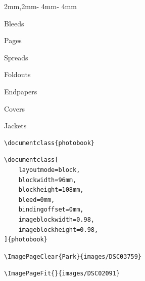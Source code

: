 \documentclass[
	layoutmode=block,
	blockwidth=96mm, blockheight=108mm,
	bleed=0mm,
	bindingoffset=0mm,
	imageblockwidth=0.98, imageblockheight=0.98,
	imageblockoffsettop=0mm,
	12pt,final,openany
]{photobook}
\newcommand\PageFushLeftC[1]{
	\begin{page}
		\begin{cell}{2mm,2mm}{\paperwidth - 4mm}{\paperheight - 4mm}
			\null
			\vfill
			\begin{flushleft}
				#1
			\end{flushleft}
			\vfill
			\null
		\end{cell}
	\end{page}}
\begin{document}
\PageFushLeftC{
		Bleeds

		Pages

		Spreads

		Foldouts

		Endpapers

		Covers

		Jackets
}



\begin{page}
\vfill
\begin{center}
\begin{BVerbatim}
\documentclass{photobook}
\end{BVerbatim}
\end{center}
\vfill
\null
\end{page}

\begin{page}%
\begin{Verbatim}[tabsize=4]
\documentclass[
	layoutmode=block,
	blockwidth=96mm, 
	blockheight=108mm,
	bleed=0mm,
	bindingoffset=0mm,
	imageblockwidth=0.98, 
	imageblockheight=0.98,
]{photobook}
\end{Verbatim}
\end{page}



\begin{page}%
\vfill%
\begin{center}%
\scriptsize%
\begin{BVerbatim}
\ImagePageClear{Park}{images/DSC03759}
\end{BVerbatim}
\end{center}%
\vfill%
\null%
\end{page}




\begin{page}%
\vfill%
\begin{center}%
\scriptsize%
\begin{BVerbatim}
\ImagePageFit{}{images/DSC02091}
\end{BVerbatim}
\end{center}%
\vfill%
\null%
\end{page}

\end{document}
